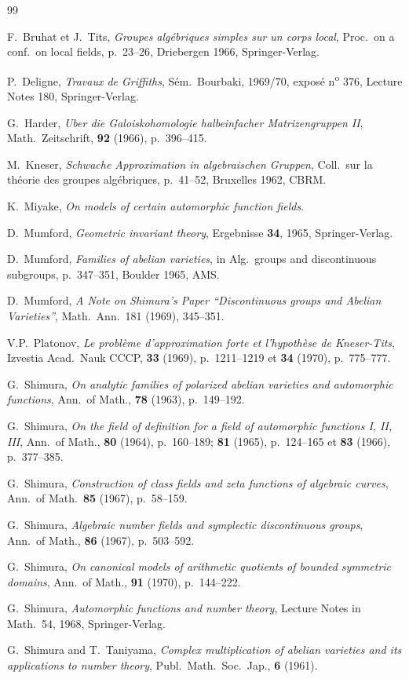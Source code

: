 \documentclass[11pt]{amsart}
\theoremstyle{plain}
\theoremstyle{definition}
\begin{document}
\begin{thebibliography}{99}

 F.\ Bruhat et J.\ Tits, \textit{Groupes alg\'ebriques simples sur un corps local}, Proc.\ on a conf.\ on local fields, p.\ 23--26, Driebergen 1966, Springer-Verlag.

 P.\ Deligne, \textit{Travaux de Griffiths}, S\'em.\ Bourbaki, 1969/70, expos\'e n\textsuperscript{o} 376, Lecture Notes 180, Springer-Verlag.

 G.\ Harder, \textit{Uber die Galoiskohomologie halbeinfacher Matrizengruppen II}, Math.\ Zeitschrift, \textbf{92} (1966), p.\ 396--415.

 M.\ Kneser, \textit{Schwache Approximation in algebraischen Gruppen}, Coll.\ sur la th\'eorie des groupes alg\'ebriques, p.\ 41--52, Bruxelles 1962, CBRM.

 K.\ Miyake, \textit{On models of certain automorphic function fields}.

 D.\ Mumford, \textit{Geometric invariant theory}, Ergebnisse \textbf{34}, 1965, Springer-Verlag.

 D.\ Mumford, \textit{Families of abelian varieties}, in Alg.\ groups and discontinuous subgroups, p.\ 347--351, Boulder 1965, AMS.

 D.\ Mumford, \textit{A Note on Shimura's Paper ``Discontinuous groups and Abelian Varieties''}, Math.\ Ann.\ 181 (1969), 345--351.

 V.P.\ Platonov, \textit{Le probl\`eme d'approximation forte et l'hypoth\`ese de Kneser-Tits}, Izvestia Acad.\ Nauk CCCP, \textbf{33} (1969), p.\ 1211--1219 et \textbf{34} (1970), p.\ 775--777.

 G.\ Shimura, \textit{On analytic families of polarized abelian varieties and automorphic functions}, Ann.\ of Math., \textbf{78} (1963), p.\ 149--192.

 G.\ Shimura, \textit{On the field of definition for a field of automorphic functions I, II, III}, Ann.\ of Math., \textbf{80} (1964), p.\ 160--189; \textbf{81} (1965), p.\ 124--165 et \textbf{83} (1966), p.\ 377--385.

 G.\ Shimura, \textit{Construction of class fields and zeta functions of algebraic curves}, Ann.\ of Math.\ \textbf{85} (1967), p.\ 58--159.

 G.\ Shimura, \textit{Algebraic number fields and symplectic discontinuous groups}, Ann.\ of Math., \textbf{86} (1967), p.\ 503--592.

 G.\ Shimura, \textit{On canonical models of arithmetic quotients of bounded symmetric domains}, Ann.\ of Math., \textbf{91} (1970), p.\ 144--222.

 G.\ Shimura, \textit{Automorphic functions and number theory}, Lecture Notes in Math.\ 54, 1968, Springer-Verlag.

 G.\ Shimura and T.\ Taniyama, \textit{Complex multiplication of abelian varieties and its applications to number theory}, Publ.\ Math.\ Soc.\ Jap., \textbf{6} (1961).

\end{thebibliography}
\end{document}
